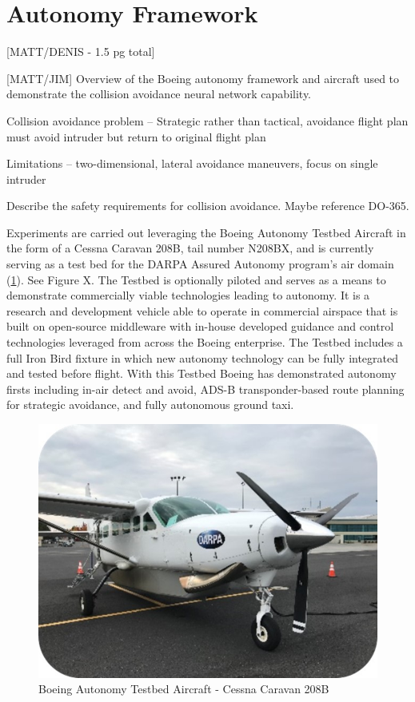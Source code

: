 \section{Autonomy Framework}

[MATT/DENIS - 1.5 pg total]

[MATT/JIM] Overview of the Boeing autonomy framework and aircraft used to demonstrate the collision avoidance neural network capability.

Collision avoidance problem -- Strategic rather than tactical, avoidance flight plan must avoid intruder but return to original flight plan

Limitations --  two-dimensional, lateral avoidance maneuvers, focus on single intruder

Describe the safety requirements for collision avoidance.  Maybe reference DO-365. 

Experiments are carried out leveraging the Boeing Autonomy Testbed Aircraft in the form of a Cessna Caravan 208B, tail number N208BX, and is currently serving as a test bed for the DARPA Assured Autonomy program’s air domain (\ref{fig:caravan}).  See Figure X.  The Testbed is optionally piloted and serves as a means to demonstrate commercially viable technologies leading to autonomy.  It is a research and development vehicle able to operate in commercial airspace that is built on open-source middleware with in-house developed guidance and control technologies leveraged from across the Boeing enterprise.  The Testbed includes a full Iron Bird fixture in which new autonomy technology can be fully integrated and tested before flight.  With this Testbed Boeing has demonstrated autonomy firsts including in-air detect and avoid, ADS-B transponder-based route planning for strategic avoidance, and fully autonomous ground taxi.

\begin{figure}
	\centering
	\includegraphics[width=\columnwidth]{figures/caravan.jpg}
	\caption{Boeing Autonomy Testbed Aircraft - Cessna Caravan 208B}
	\label{fig:caravan}
\end{figure}

